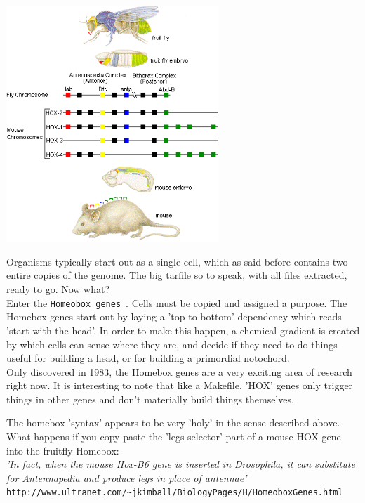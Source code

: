 \documentclass[11pt,twoside,a4paper]{article}
\begin{document}
\begin{minipage}[ht]{8.10cm}
	\includegraphics[width=8.0cm]{img/homeobox.png}
\end{minipage} \hfill \begin{minipage}[ht]{12.75cm}
	Organisms typically start out as a single cell, which as said before contains two entire copies of the genome. The big tarfile so to speak, with all files extracted, ready to go. Now what? ~\\

	Enter the \texttt{Homeobox genes}~\footnotemark. Cells must be copied and assigned a purpose. The Homebox genes start out by laying a 'top to bottom' dependency which reads 'start with the head'. In order to make this happen, a chemical gradient is created by which cells can sense where they are, and decide if they need to do things useful for building a head, or for building a primordial notochord. ~\\
	
	Only discovered in 1983, the Homebox genes are a very exciting area of research right now. It is interesting to note that like a Makefile, 'HOX' genes only trigger things in other genes and don't materially build things themselves. ~\\
\end{minipage}

The homebox 'syntax' appears to be very 'holy' in the sense described above. What happens if you copy paste the 'legs selector' part of a mouse HOX gene into the fruitfly Homebox: ~\\

	\emph{'In fact, when the mouse Hox-B6 gene is inserted in Drosophila, it can substitute for Antennapedia and produce legs in place of antennae'} ~\\
	\texttt{http://www.ultranet.com/\textasciitilde jkimball/BiologyPages/H/HomeoboxGenes.html} ~\\
\end{document}
